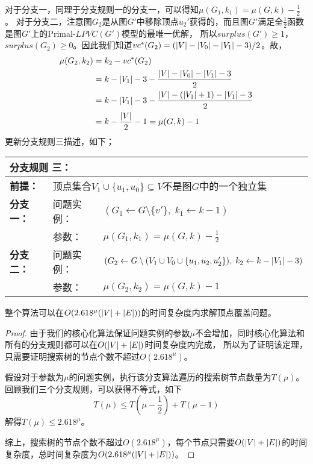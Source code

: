 对于分支一，同理于分支规则一的分支一，可以得知$\mu(G_1, k_1) = \mu(G, k) - \frac{1}{2}$。
对于分支二，注意图$G_2$是从图$G'$中移除顶点$u_2'$获得的，而且图$G'$满足全$\frac{1}{2}$函数是图$G'$上的Primal-$LPVC(G')$模型的最唯一优解，
所以$surplus(G') \ge 1$，$surplus(G_2) \ge 0$。因此我们知道$vc^*(G_2) = (\left\vert V \right\vert - \left\vert V_0 \right\vert - \left\vert V_1 \right\vert - 3) / 2$。故，
\begin{equation*} \begin{aligned}
    \mu(G_2, k_2) & = k_2 - vc^*(G_2)  \\
                  & = k - \left\vert V_1 \right\vert - 3 - \frac{\left\vert V \right\vert - \left\vert V_0 \right\vert - \left\vert V_1 \right\vert - 3}{2} \\
                  & = k - \left\vert V_1 \right\vert - 3 - \frac{\left\vert V \right\vert - (\left\vert V_1 \right\vert + 1) - \left\vert V_1 \right\vert - 3}{2} \\
                  & = k - \frac{\left\vert V \right\vert}{2} - 1 = \mu(G, k) - 1
\end{aligned} \end{equation*}
更新分支规则三描述，如下；\\

\begin{tabular}{ p{0.12\headwidth} | p{0.12\headwidth}p{0.66\headwidth} }
  \multicolumn{3}{l}{ \textbf{分支规则 三：} }\\
  \hline
  \textbf{前提：}  & \multicolumn{2}{l}{顶点集合$V_1 \cup \{u_1, u_0\}\subseteq V$不是图$G$中的一个独立集}\\
  \hline
  \textbf{分支一：} & 问题实例：&$(G_1 \leftarrow G \setminus \{v'\},\; k_1 \leftarrow k - 1)$ \\
                    & 参数：&$\mu(G_1, k_1) = \mu(G, k) - \frac{1}{2}$\\
  \hline
  \textbf{分支二：} & 问题实例：&$(G_2 \leftarrow G \setminus (V_1\cup V_0  \cup \{u_1, u_2, u_2'\}) ,\; k_2 \leftarrow k - \left\vert V_1 \right\vert - 3)$\\
                    & 参数：&$\mu(G_2, k_2) = \mu(G, k) - 1$\\
  \hline
\end{tabular} \vspace{0.5cm}


\begin{theorem}
  整个算法可以在$O(2.618^{\mu}(\left\vert V \right\vert + \left\vert E \right\vert))$的时间复杂度内求解顶点覆盖问题。
\end{theorem}
\begin{proof}
  由于我们的核心化算法保证问题实例的参数$\mu$不会增加，同时核心化算法和所有的分支规则都可以在$O(\left\vert V \right\vert + \left\vert E \right\vert)$时间复杂度内完成，
  所以为了证明该定理，只需要证明搜索树的节点个数不超过$O(2.618^{\mu})$。

  假设对于参数为$\mu$的问题实例，执行该分支算法遍历的搜索树节点数量为$T(\mu)$。
  回顾我们三个分支规则，可以获得不等式，如下
  \[ T(\mu) \le T(\mu - \frac{1}{2}) + T(\mu - 1) \]
  解得$T(\mu) \le 2.618^{\mu}$。

  综上，搜索树的节点个数不超过$O(2.618^{\mu})$，每个节点只需要$O(\left\vert V \right\vert + \left\vert E \right\vert)$的时间复杂度，总时间复杂度为$O(2.618^{\mu}(\left\vert V \right\vert + \left\vert E \right\vert))$。
\end{proof}

